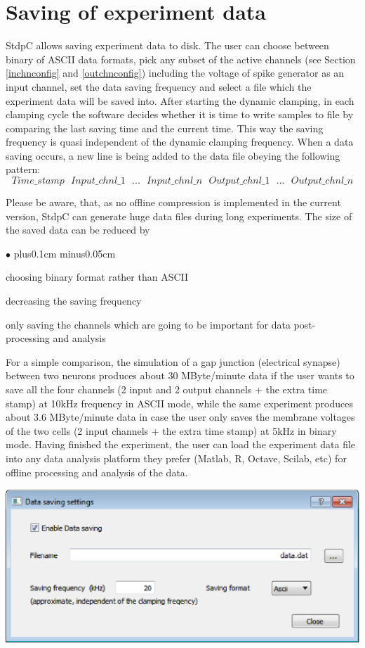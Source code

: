 \documentclass{article}
\newenvironment{myitem}{\begin{list}{$\bullet$}{\setlength{\leftmargin}{1.1em}
\itemsep0.1cm plus0.1cm minus0.05cm
\listparindent0cm
\addtolength{\labelsep}{0.5\labelsep}
\setlength{\labelwidth}{0.8em}
\setlength{\leftmargin}{\labelwidth}
\addtolength{\leftmargin}{\labelsep}
}}{\end{list}}
\begin{document}
\section{Saving of experiment data} \label{datasaving}

StdpC allows saving experiment data to disk.
The user can choose between binary of ASCII data formats, pick
any subset of the active channels (see Section \ref{inchnconfig} and
\ref{outchnconfig}) including the voltage of spike generator as an input
channel, set the data saving frequency and select a file which the
experiment data will be saved into. After starting the dynamic clamping, in
each clamping cycle the software decides whether it is time to write samples
to file by comparing the last saving time and the current time. This way the
saving frequency is quasi independent of the dynamic clamping
frequency. When a data saving occurs, a new line is being added to the
data file obeying the following pattern:
\begin{equation*}
Time\_stamp\ \ \ Input\_chnl\_1
\ \ \ ...\ \ \ Input\_chnl\_n\ \ \  Output\_chnl\_1\ \ \ ...\ \ \ Output\_chnl\_n  
\end{equation*}

Please be aware, that, as no offline compression is implemented in the
current version, StdpC can generate huge data files during long
experiments. The size of the saved data can be reduced by
\begin{myitem} 
\item choosing binary format rather than ASCII
\item decreasing the saving frequency
\item only saving the channels which are going to be important for data
  post-processing and analysis
\end{myitem}
For a simple comparison, the simulation of a gap junction (electrical
synapse) between two neurons produces about 30 MByte/minute data if the
user wants to save all the four channels (2 input and 2 output channels
+ the extra time stamp) at 10kHz frequency in ASCII mode, while the same
experiment produces about 3.6 MByte/minute data in case the user only saves the
membrane voltages of the two cells (2 input channels + the extra time
stamp) at 5kHz in binary mode. 
Having finished the experiment, the user can load the experiment data file
into any data analysis platform they prefer (Matlab, R, Octave, Scilab,
etc) for offline processing and analysis of the data.

\includegraphics[scale=0.6]{dataSavingDialog}
\end{document}

